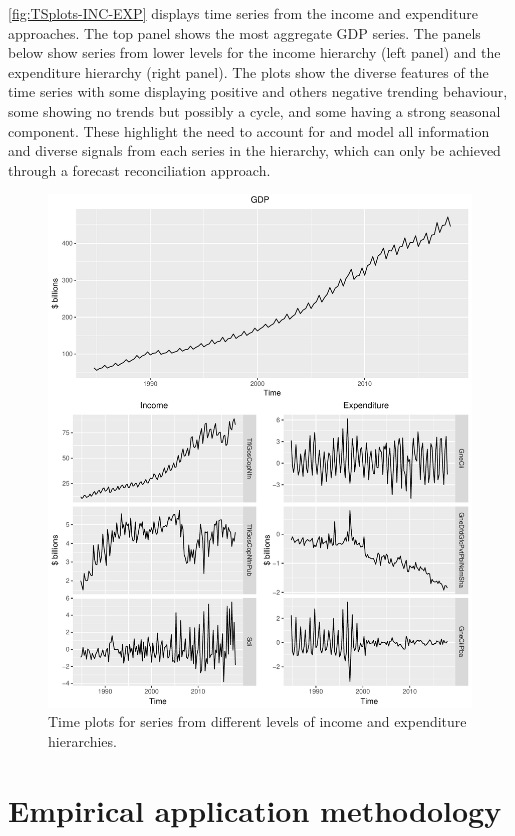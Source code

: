\documentclass[graybox]{svmult}
\begin{document}
\autoref{fig:TSplots-INC-EXP} displays time series from the income and expenditure approaches. The top panel shows the most aggregate GDP series. The panels below show series from lower levels for the income hierarchy (left panel) and the expenditure hierarchy (right panel). The plots show the diverse features of the time series with some displaying positive and others negative trending behaviour, some showing no trends but possibly a cycle, and some having a strong seasonal component. These highlight the need to account for and model all information and diverse signals from each series in the hierarchy, which can only be achieved through a forecast reconciliation approach.

\begin{figure}
	\centering
	\small
	\includegraphics[width = \textwidth]{Figs/TS-plots/TSplots-INC-EXP.pdf}
	\caption{Time plots for series from different levels of income and expenditure hierarchies.}\label{fig:TSplots-INC-EXP}
\end{figure}

\section{Empirical application methodology}\label{sec:meth}
\end{document}
